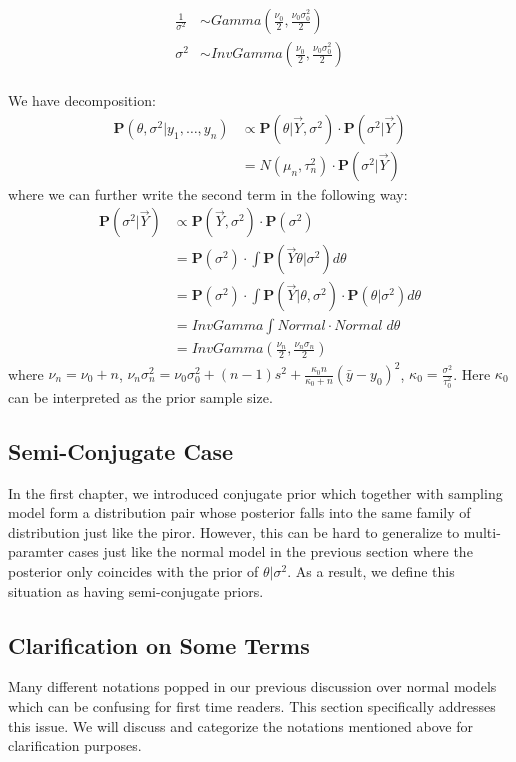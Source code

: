 \begin{align*}
    \frac{1}{\sigma^2} &\sim Gamma(\frac{\nu_0}{2}, \frac{\nu_0\sigma_0^2}{2}) \\
    \sigma^2 &\sim InvGamma(\frac{\nu_0}{2}, \frac{\nu_0\sigma_0^2}{2}) \\
\end{align*}

We have decomposition:
\begin{align*}
    \mathbf{P}(\theta, \sigma^2 | y_1, \ldots, y_n) &\propto \mathbf{P}(\theta | \vec{Y}, \sigma^2) \cdot \mathbf{P}(\sigma^2 | \vec{Y}) \\
    &= N(\mu_n, \tau_n^2) \cdot \mathbf{P}(\sigma^2 | \vec{Y})
\end{align*}
where we can further write the second term in the following way:
\begin{align*}
    \mathbf{P}(\sigma^2 | \vec{Y}) &\propto \mathbf{P}(\vec{Y}, \sigma^2) \cdot \mathbf{P}(\sigma^2) \\
    &= \mathbf{P}(\sigma^2) \cdot \int \mathbf{P}(\vec{Y} \theta | \sigma^2) d\theta \\
    &= \mathbf{P}(\sigma^2) \cdot \int \mathbf{P}(\vec{Y} | \theta, \sigma^2) \cdot \mathbf{P}(\theta | \sigma^2) d\theta \\
    &=InvGamma \int Normal \cdot Normal \;d\theta \\
    &= InvGamma(\frac{\nu_n}{2}, \frac{\nu_n\sigma_n}{2})
\end{align*}
where $\nu_n = \nu_0 + n$, $\nu_n\sigma_n^2 = \nu_0\sigma_0^2 + (n-1)s^2 + \frac{\kappa_0n}{\kappa_0 + n}(\bar{y} - y_0)^2$, $\kappa_0 = \frac{\sigma^2}{\tau_0^2}$. Here $\kappa_0$ can be interpreted as the prior sample size. 

\subsection*{Semi-Conjugate Case}
In the first chapter, we introduced conjugate prior which together with sampling model form a distribution pair whose posterior falls into the same family of distribution just like the piror. However, this can be hard to generalize to multi-paramter cases just like the normal model in the previous section where the posterior only coincides with the prior of $\theta | \sigma^2$. As a result, we define this situation as having semi-conjugate priors.

\subsection{Clarification on Some Terms}
Many different notations popped in our previous discussion over normal models which can be confusing for first time readers. This section specifically addresses this issue. We will discuss and categorize the notations mentioned above for clarification purposes. 

